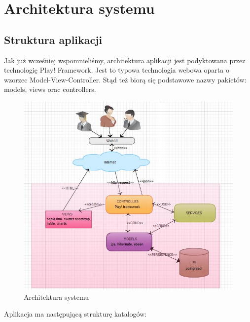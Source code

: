 \documentclass[a4paper,12pt,notitlepage]{mwrep}
\begin{document}
\chapter{Architektura systemu}

\section{Struktura aplikacji}
Jak już wcześniej wspomnieliśmy, architektura aplikacji jest podyktowana przez technologię Play! Framework. Jest to 
typowa technologia webowa oparta o wzorzec Model-View-Controller. Stąd też biorą się podstawowe nazwy pakietów: models, 
views orac controllers. \\
\begin{figure}[H]
\centering
\includegraphics[scale=1.0]{images/tasksArch.jpg}
\caption{Architektura systemu}
\label{fig:tasksArch}
\end{figure}

Aplikacja ma następującą strukturę katalogów:
\end{document}

